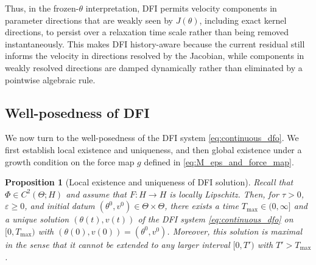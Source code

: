 \documentclass[oneside,11pt]{article}
\newtheorem{proposition}{Proposition}
\theoremstyle{remark}
\theoremstyle{thmstyleone}
\theoremstyle{thmstylethree}
\theoremstyle{thmstyletwo}
\begin{document}
Thus, in the frozen-$\theta$ interpretation, DFI permits velocity components in parameter directions that are weakly seen by $J(\theta)$, including exact kernel directions, to persist over a relaxation time scale rather than being removed instantaneously. This makes DFI history-aware because the current residual still informs the velocity in directions resolved by the Jacobian, while components in weakly resolved directions are damped dynamically rather than eliminated by a pointwise algebraic rule.


\subsection{Well-posedness of DFI}
We now turn to the well-posedness of the DFI system \eqref{eq:continuous_dfo}. We first establish local existence and uniqueness, and then global existence under a growth condition on the force map $g$ defined in \eqref{eq:M_eps_and_force_map}.
\begin{proposition}[Local existence and uniqueness of DFI solution]
          \label{prop:local_wellposedness_dfo}
          Recall that $\Phi\in C^2(\Theta;H)$ and assume that $F:H\to H$ is locally Lipschitz.
          Then, for $\tau>0$,  $\varepsilon\ge0$, and  initial datum
          $(\theta^0,v^0)\in \Theta\times \Theta$, there exists a time $T_{\text{max}} \in (0, \infty]$ and a unique solution $(\theta(t), v(t))$ of the DFI system
          \eqref{eq:continuous_dfo} on $[0, T_{\text{max}})$ with $(\theta(0), v(0)) = (\theta^0, v^0)$. Moreover, this solution is maximal in the sense that it cannot be extended to any larger interval $[0, T')$ with $T' > T_{\text{max}}$. 
        \end{proposition}
\end{document}
